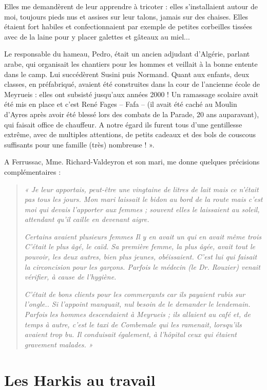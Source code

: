 Elles me demandèrent de leur apprendre à tricoter : elles s’installaient autour de
moi, toujours pieds nus et assises sur leur talons, jamais sur des chaises. Elles étaient
fort habiles et confectionnaient par exemple de petites corbeilles tissées avec de la
laine pour y placer galettes et gâteaux au miel...

Le responsable du hameau, Pedro, était un ancien adjudant d’Algérie, parlant arabe,
qui organisait les chantiers pour les hommes et veillait à la bonne entente dans le
camp. Lui succédèrent Susini puis Normand. Quant aux enfants, deux classes, en
préfabriqué, avaient été construites dans la cour de l’ancienne école de Meyrueis :
elles ont subsisté jusqu’aux années 2000 ! Un ramassage scolaire avait été mis en
place et c’est René Fages -- Fafa -- (il avait été caché au Moulin d’Ayres après avoir été blessé
lors des combats de la Parade, 20 ans auparavant), qui faisait office de chauffeur.
A notre égard ils furent tous d’une gentillesse extrême, avec de multiples attentions,
de petits cadeaux et des bols de couscous suffisants pour une famille (très)
nombreuse ! ».

A Ferrussac, Mme. Richard-Valdeyron et son mari, me donne quelques précisions
complémentaires :

\begin{quote}
\textit{« Je leur apportais, peut-être une vingtaine de litres de lait mais ce n’était pas tous
les jours. Mon mari laissait le bidon au bord de la route mais c’est moi qui devais
l’apporter aux femmes ; souvent elles le laissaient au soleil, attendant qu’il caille en
devenant aigre.}

\textit{Certains avaient plusieurs femmes Il y en avait un qui en avait même trois C’était le
plus âgé, le caïd. Sa première femme, la plus âgée, avait tout le pouvoir, les deux
autres, bien plus jeunes, obéissaient. C’est lui qui faisait la circoncision pour les
garçons. Parfois le médecin (le Dr. Rouzier) venait vérifier, à cause de l’hygiène.}

\textit{C’était de bons clients pour les commerçants car ils payaient rubis sur l’ongle.. Si
l’appoint manquait, nul besoin de le demander le lendemain. Parfois les hommes
descendaient à Meyrueis ; ils allaient au café et, de temps à autre, c’est le taxi de
Combemale qui les ramenait, lorsqu’ils avaient trop bu. Il conduisait également, à
l’hôpital ceux qui étaient gravement malades. »}
\end{quote}

\section*{Les Harkis au travail}

